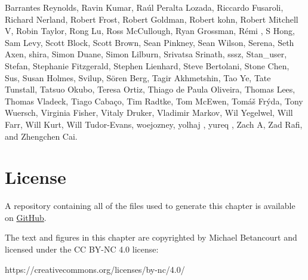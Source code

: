 \documentclass[
  letterpaper,
  DIV=11,
  numbers=noendperiod]{scrartcl}
\begin{document}
Barrantes Reynolds, Ravin Kumar, Raúl Peralta Lozada, Riccardo Fusaroli,
Richard Nerland, Robert Frost, Robert Goldman, Robert kohn, Robert
Mitchell V, Robin Taylor, Rong Lu, Ross McCullough, Ryan Grossman, Rémi
, S Hong, Sam Levy, Scott Block, Scott Brown, Sean Pinkney, Sean Wilson,
Serena, Seth Axen, shira, Simon Duane, Simon Lilburn, Srivatsa Srinath,
sssz, Stan\_user, Stefan, Stephanie Fitzgerald, Stephen Lienhard, Steve
Bertolani, Stone Chen, Sus, Susan Holmes, Svilup, Sören Berg, Tagir
Akhmetshin, Tao Ye, Tate Tunstall, Tatsuo Okubo, Teresa Ortiz, Thiago de
Paula Oliveira, Thomas Lees, Thomas Vladeck, Tiago Cabaço, Tim Radtke,
Tom McEwen, Tomáš Frýda, Tony Wuersch, Virginia Fisher, Vitaly Druker,
Vladimir Markov, Wil Yegelwel, Will Farr, Will Kurt, Will Tudor-Evans,
woejozney, yolhaj , yureq , Zach A, Zad Rafi, and Zhengchen Cai.

\hypertarget{license}{%
\section*{License}\label{license}}

A repository containing all of the files used to generate this chapter
is available on
\href{https://github.com/betanalpha/quarto_chapters/tree/main/probability_on_finite_spaces}{GitHub}.

The text and figures in this chapter are copyrighted by Michael
Betancourt and licensed under the CC BY-NC 4.0 license:

https://creativecommons.org/licenses/by-nc/4.0/
\end{document}
